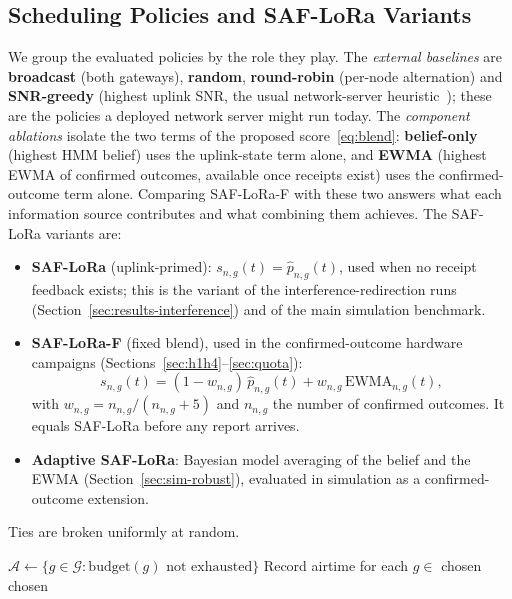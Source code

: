 \documentclass[journal]{IEEEtran}
\begin{document}
\subsection{Scheduling Policies and SAF-LoRa Variants}
\label{sec:scheduling}
We group the evaluated policies by the role they play. The \emph{external baselines} are \textbf{broadcast} (both gateways), \textbf{random}, \textbf{round-robin} (per-node alternation) and \textbf{SNR-greedy} (highest uplink SNR, the usual network-server heuristic~\cite{mojamed2023}); these are the policies a deployed network server might run today. The \emph{component ablations} isolate the two terms of the proposed score~\eqref{eq:blend}: \textbf{belief-only} (highest HMM belief) uses the uplink-state term alone, and \textbf{EWMA} (highest EWMA of confirmed outcomes, available once receipts exist) uses the confirmed-outcome term alone. Comparing SAF-LoRa-F with these two answers what each information source contributes and what combining them achieves. The SAF-LoRa variants are:
\begin{itemize}
\item \textbf{SAF-LoRa} (uplink-primed): $s_{n,g}(t)=\hat p_{n,g}(t)$, used when no receipt feedback exists; this is the variant of the interference-redirection runs (Section~\ref{sec:results-interference}) and of the main simulation benchmark.
\item \textbf{SAF-LoRa-F} (fixed blend), used in the confirmed-outcome hardware campaigns (Sections~\ref{sec:h1h4}--\ref{sec:quota}):
\begin{equation}
s_{n,g}(t)=(1-w_{n,g})\,\hat p_{n,g}(t)+w_{n,g}\,\mathrm{EWMA}_{n,g}(t),
\label{eq:blend}
\end{equation}
with $w_{n,g}=n_{n,g}/(n_{n,g}+5)$ and $n_{n,g}$ the number of confirmed outcomes. It equals SAF-LoRa before any report arrives.
\item \textbf{Adaptive SAF-LoRa}: Bayesian model averaging of the belief and the EWMA (Section~\ref{sec:sim-robust}), evaluated in simulation as a confirmed-outcome extension.
\end{itemize}
Ties are broken uniformly at random.

\begin{algorithm}[!t]
\caption{Server-Side Downlink Scheduling}
\label{alg:scheduler}
\SetAlgoLined
{}
$\mathcal{A} \leftarrow \{g \in \mathcal{G} : \text{budget}(g) \text{ not exhausted}\}$\;
Record airtime for each $g\in$ chosen\;
\Return chosen\;
\end{algorithm}
\end{document}
